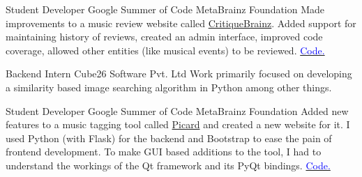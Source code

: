     {Student Developer}
    {Google Summer of Code}
    {MetaBrainz Foundation}
    {}
    {
        Made improvements to a music review website called \href{http://critiquebrainz.org/}{CritiqueBrainz}. Added support for maintaining history of reviews, created an admin interface, improved code coverage, allowed other entities (like musical events) to be reviewed.
        \href{https://bitbucket.org/metabrainz/critiquebrainz/commits/all?author=dufferzafar}{\textcolor{blue}{\scriptsize Code.}}
    }
    \vspace*{0.2\baselineskip}

    {Backend Intern}
    {Cube26 Software Pvt. Ltd}
    {}
    {}
    {
        Work primarily focused on developing a similarity based image searching algorithm in Python among other things.
    }
    \vspace*{0.2\baselineskip}

    {Student Developer}
    {Google Summer of Code}
    {MetaBrainz Foundation}
    {}
    {
        Added new features to a music tagging tool called \href{http://picard.musicbrainz.org/}{Picard} and created a new website for it.
        \newline
        I used Python (with Flask) for the backend and Bootstrap to ease the pain of frontend development.
        To make GUI based additions to the tool, I had to understand the workings of the Qt framework and its PyQt bindings.
        \href{https://github.com/musicbrainz/picard-website/commits?author=dufferzafar}{\textcolor{blue}{\scriptsize Code.}}
    }
    \vspace*{0.2\baselineskip}
